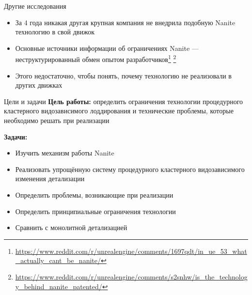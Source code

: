 \begin{frame}{Другие исследования}
    \begin{itemize}
        \item За 4 года никакая другая крупная компания не внедрила подобную Nanite технологию в свой движок
        \item Основные источники информации об ограничениях Nanite --- неструктурированный обмен опытом разработчиков\footnote{\url{https://www.reddit.com/r/unrealengine/comments/1697qdt/in_ue_53_what_actually_cant_be_nanite/}} \footnote{\url{https://www.reddit.com/r/unrealengine/comments/s2snhw/is_the_technology_behind_nanite_patented/}}
        \item Этого недостаточно, чтобы понять, почему технологию не реализовали в других движках
    \end{itemize}
\end{frame}

\begin{frame}{Цели и задачи}
    \textbf{Цель работы:}
    определить ограничения технологии процедурного кластерного видозависимого лоддирования и технические проблемы, которые необходимо решать при реализации

    \bigskip

    \textbf{Задачи:}
    \begin{itemize}
        \item Изучить механизм работы Nanite
        \item Реализовать упрощённую систему процедурного кластерного видозависимого изменения детализации
        \item Определить проблемы, возникающие при реализации
        \item Определить принципиальные ограничения технологии
        \item Сравнить с монолитной детализацией
    \end{itemize}
\end{frame}
